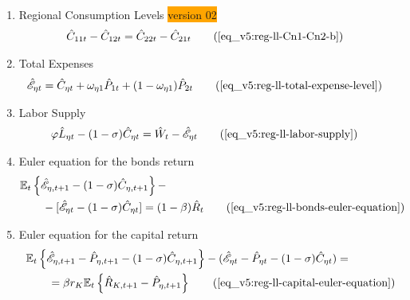 \documentclass[../thesis.tex]{subfiles}
\begin{document}
{\begin{itemize}
\begin{enumerate}
\item Regional Consumption Levels \colorbox{orange}{version 02}
\begin{align}
	\hat{C}_{11t} - \hat{C}_{12t} &= \hat{C}_{22t} - \hat{C}_{21t} \tag{\ref{eq_v5:reg-ll-Cn1-Cn2-b}}
\end{align}		

		
		\begin{comment}
			
		\item Regional Levels of Consumption and Prices
		\begin{align}
			\hat{C}_{\eta 1 t} - \hat{C}_{\eta 2 t} &= \hat{P}_{2 t} - \hat{P}_{1 t} \tag{\ref{eq_v5:reg-ll-regional-consumption-and-prices}}
		\end{align}	
			
		\end{comment}
		
		
		\item Total Expenses
		\begin{align}
			\hat{\mathscr{E}}_{\eta t} &= \hat{C}_{\eta t} + \omega_{\eta 1} \hat{P}_{1 t} + (1 -\omega_{\eta 1}) \hat{P}_{2 t} \tag{\ref{eq_v5:reg-ll-total-expense-level}}
		\end{align}

		\item Labor Supply
		\begin{alignat}{2}
			\varphi \hat{L}_{\eta t} - (1 -\sigma) \hat{C}_{\eta t} &= \hat{W}_t - \hat{ \mathscr{E} }_{\eta t} \tag{\ref{eq_v5:reg-ll-labor-supply}}
		\end{alignat}
		
		\item Euler equation for the bonds return
		\begin{alignat}{2}
			& \E \left\{ \hat{\mathscr{E}}_{\eta, t+1} - (1 -\sigma)\hat{C}_{\eta, t+1} \right\} - \nonumber \\ & \qquad - [\hat{\mathscr{E}}_{\eta t} - (1 -\sigma)\hat{C}_{\eta t}] = (1 -\beta) \hat{R}_{t} \tag{\ref{eq_v5:reg-ll-bonds-euler-equation}}
		\end{alignat}
		
		\item Euler equation for the capital return
		\begin{alignat}{2}
			& \E \left\{ \hat{\mathscr{E}}_{\eta, t+1} - \hat{P}_{\eta, t+1}  - (1 -\sigma) \hat{C}_{\eta, t+1} \right\} - (\hat{\mathscr{E}}_{\eta t} - \hat{P}_{\eta t} - (1 -\sigma) \hat{C}_{\eta t}) = \nonumber \\
			& \qquad = \beta r_{K} \mathbb{E}_t \left\{ \hat{R}_{K, t+1} - \hat{P}_{\eta, t+1} \right\} \tag{\ref{eq_v5:reg-ll-capital-euler-equation}}
		\end{alignat}
		

\end{enumerate}
\end{itemize}}
\end{document}
